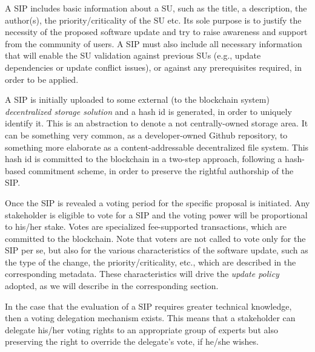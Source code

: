 A SIP includes basic information about a SU, such as the title, a description, the author(s), the priority/criticality of the SU etc. Its sole purpose is to justify the necessity of the proposed software update and try to raise awareness and support from the community of users. A SIP must also include all necessary information that will enable the SU validation against previous SUs (e.g., update dependencies or update conflict issues), or against any prerequisites required, in order to be applied.

A SIP is initially uploaded to some external (to the blockchain system) \emph{decentralized storage solution} and a hash id is generated, in order to uniquely identify it. This is an abstraction to denote a not centrally-owned storage area.%
  It can be something very common, as a developer-owned Github repository, to something more elaborate as a content-addressable decentralized file system.  This hash id is committed to the blockchain in a two-step approach, following a hash-based commitment scheme, in order to preserve the rightful authorship of the SIP.

Once the SIP is revealed a voting period for the specific proposal is initiated. Any stakeholder is eligible to vote for a SIP and the voting power will be proportional to his/her stake. Votes are specialized fee-supported transactions, which are committed to the blockchain. Note that voters are not called to vote only for the SIP per se, but also for the various characteristics of the software update, such as the type of the change, the priority/criticality, etc., which are described in the corresponding metadata. These characteristics will drive the \emph{update policy} adopted, as we will describe in the corresponding section.

In the case that the evaluation of a SIP requires greater technical knowledge, then a voting delegation mechanism exists. This means that a stakeholder can delegate his/her voting rights to an appropriate group of experts but also preserving the right to override the delegate's vote, if he/she wishes. 

